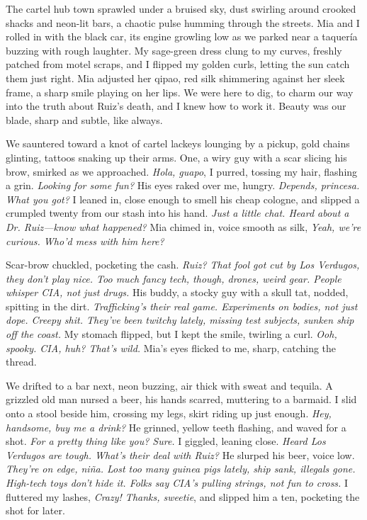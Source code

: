 \documentclass[12pt,oneside]{book} %
\begin{document}
The cartel hub town sprawled under a bruised sky, dust swirling around crooked shacks and neon-lit bars, a chaotic pulse humming through the streets. Mia and I rolled in with the black car, its engine growling low as we parked near a taquería buzzing with rough laughter. My sage-green dress clung to my curves, freshly patched from motel scraps, and I flipped my golden curls, letting the sun catch them just right. Mia adjusted her qipao, red silk shimmering against her sleek frame, a sharp smile playing on her lips. We were here to dig, to charm our way into the truth about Ruiz’s death, and I knew how to work it. Beauty was our blade, sharp and subtle, like always.

We sauntered toward a knot of cartel lackeys lounging by a pickup, gold chains glinting, tattoos snaking up their arms. One, a wiry guy with a scar slicing his brow, smirked as we approached. \textit{Hola, guapo}, I purred, tossing my hair, flashing a grin. \textit{Looking for some fun?} His eyes raked over me, hungry. \textit{Depends, princesa. What you got?} I leaned in, close enough to smell his cheap cologne, and slipped a crumpled twenty from our stash into his hand. \textit{Just a little chat. Heard about a Dr. Ruiz—know what happened?} Mia chimed in, voice smooth as silk, \textit{Yeah, we’re curious. Who’d mess with him here?}

Scar-brow chuckled, pocketing the cash. \textit{Ruiz? That fool got cut by Los Verdugos, they don’t play nice. Too much fancy tech, though, drones, weird gear. People whisper CIA, not just drugs.} His buddy, a stocky guy with a skull tat, nodded, spitting in the dirt. \textit{Trafficking’s their real game. Experiments on bodies, not just dope. Creepy shit. They’ve been twitchy lately, missing test subjects, sunken ship off the coast.} My stomach flipped, but I kept the smile, twirling a curl. \textit{Ooh, spooky. CIA, huh? That’s wild.} Mia’s eyes flicked to me, sharp, catching the thread.

We drifted to a bar next, neon buzzing, air thick with sweat and tequila. A grizzled old man nursed a beer, his hands scarred, muttering to a barmaid. I slid onto a stool beside him, crossing my legs, skirt riding up just enough. \textit{Hey, handsome, buy me a drink?} He grinned, yellow teeth flashing, and waved for a shot. \textit{For a pretty thing like you? Sure.} I giggled, leaning close. \textit{Heard Los Verdugos are tough. What’s their deal with Ruiz?} He slurped his beer, voice low. \textit{They’re on edge, niña. Lost too many guinea pigs lately, ship sank, illegals gone. High-tech toys don’t hide it. Folks say CIA’s pulling strings, not fun to cross.} I fluttered my lashes, \textit{Crazy! Thanks, sweetie}, and slipped him a ten, pocketing the shot for later.
\end{document}
